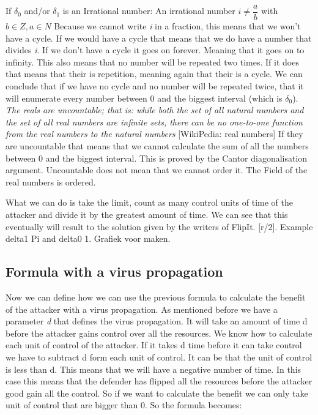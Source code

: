 

If $\delta_{0}$ and/or $\delta_{1}$ is an Irrational number:
An irrational number $ i \neq \dfrac{a}{b}$ with $b \in Z, a \in N$
Because we cannot write \textit{i} in a fraction, this means that we won't have a cycle. If we would have a cycle that means that we do have a number that divides \textit{i}. If we don't have a cycle it goes on forever. Meaning that it goes on to infinity. This also means that no number will be repeated two times. If it does that means that their is repetition, meaning again that their is a cycle. We can conclude that if we have no cycle and no number will be repeated twice, that it will enumerate every number between 0 and the biggest interval (which is $\delta_{0}$). 
\textit{The reals are uncountable; that is: while both the set of all natural numbers and the set of all real numbers are infinite sets, there can be no one-to-one function from the real numbers to the natural numbers} [WikiPedia: real numbers] If they are uncountable that means that we cannot calculate the sum of all the numbers between 0 and the biggest interval. This is proved by the Cantor diagonalisation argument. Uncountable does not mean that we cannot order it. The Field of the real numbers is ordered. 

What we can do is take the limit, count as many control units of time of the attacker and divide it by the greatest amount of time. We can see that this eventually will result to the solution given by the writers of FlipIt. [r/2]. Example delta1 Pi and delta0 1. Grafiek voor maken.


\subsection{Formula with a virus propagation}
Now we can define how we can use the previous formula to calculate the benefit of the attacker with a virus propagation.
As mentioned before we have a parameter \textit{d} that defines the virus propagation. It will take an amount of time d before the attacker gains control over all the resources. We know how to calculate each unit of control of the attacker. If it takes d time before it can take control we have to subtract d form each unit of control. It can be that the unit of control is less than d. This means that we will have a negative number of time. In this case this means that the defender has flipped all the resources before the attacker good gain all the control. So if we want to calculate the benefit we can only take unit of control that are bigger than 0. So the formula becomes:

